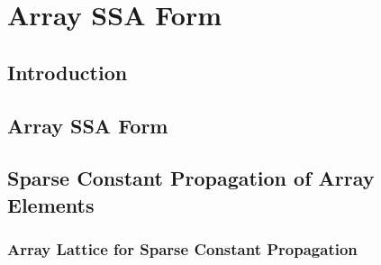\chapter{Array SSA Form }
\label{chapter:array_ssa}
{}

\section{Introduction}
\label{sec:intro}

\section{Array SSA Form}
\label{sec:arrayssa}

\section{Sparse Constant Propagation of Array Elements}\label{sec:cp}
\subsection{Array Lattice for Sparse Constant Propagation }
\label{sec:arraylattice}

